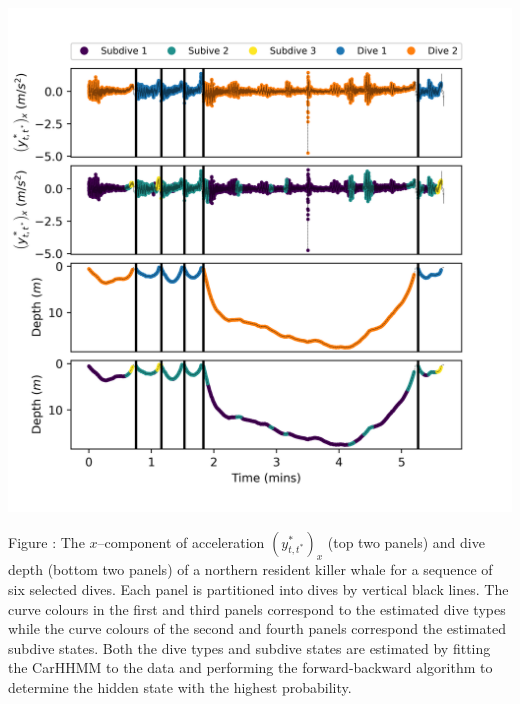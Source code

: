 \documentclass{article}
\begin{document}
        \begin{center}
        \includegraphics[width=6in]{../Plots/2019/20190902-182840-CATs_OB_1_0_267_CarHHMM1_decoded_dives.png}
        \end{center}
        
        \noindent Figure : The $x$--component of acceleration $(y^*_{t,t^*})_x$ (top two panels) and dive depth (bottom two panels) of a northern resident killer whale for a sequence of six selected dives. Each panel is partitioned into dives by vertical black lines. The curve colours in the first and third panels correspond to the estimated dive types while the curve colours of the second and fourth panels correspond the estimated subdive states. Both the dive types and subdive states are estimated by fitting the CarHHMM to the data and performing the forward-backward algorithm to determine the hidden state with the highest probability.
        \addtocounter{fignum}{1}
        
\end{document}
